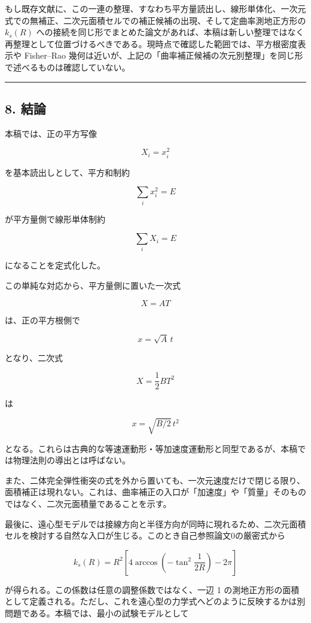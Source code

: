 \documentclass[
]{ltjsarticle}
\begin{document}
もし既存文献に、この一連の整理、すなわち平方量読出し、線形単体化、一次元式での無補正、二次元面積セルでの補正候補の出現、そして定曲率測地正方形の
\(k_s(R)\)
への接続を同じ形でまとめた論文があれば、本稿は新しい整理ではなく再整理として位置づけるべきである。現時点で確認した範囲では、平方根密度表示や
Fisher--Rao
幾何は近いが、上記の「曲率補正候補の次元別整理」を同じ形で述べるものは確認していない。

\begin{center}\rule{0.5\linewidth}{0.5pt}\end{center}

\subsection{8. 結論}\label{ux7d50ux8ad6}

本稿では、正の平方写像

\[
X_i=x_i^2
\]

を基本読出しとして、平方和制約

\[
\sum_i x_i^2=E
\]

が平方量側で線形単体制約

\[
\sum_i X_i=E
\]

になることを定式化した。

この単純な対応から、平方量側に置いた一次式

\[
X=A T
\]

は、正の平方根側で

\[
x=\sqrt{A}\,t
\]

となり、二次式

\[
X=\frac{1}{2} B T^2
\]

は

\[
x=\sqrt{B/2}\,t^2
\]

となる。これらは古典的な等速運動形・等加速度運動形と同型であるが、本稿では物理法則の導出とは呼ばない。

また、二体完全弾性衝突の式を外から置いても、一次元速度だけで閉じる限り、面積補正は現れない。これは、曲率補正の入口が「加速度」や「質量」そのものではなく、二次元面積量であることを示す。

最後に、遠心型モデルでは接線方向と半径方向が同時に現れるため、二次元面積セルを検討する自然な入口が生じる。このとき自己参照論文0の厳密式から

\[
k_s(R)
=
R^2
\left[
4\arccos\!\left(-\tan^2\frac{1}{2R}\right)-2\pi
\right]
\]

が得られる。この係数は任意の調整係数ではなく、一辺 1
の測地正方形の面積として定義される。ただし、これを遠心型の力学式へどのように反映するかは別問題である。本稿では、最小の試験モデルとして
\end{document}
